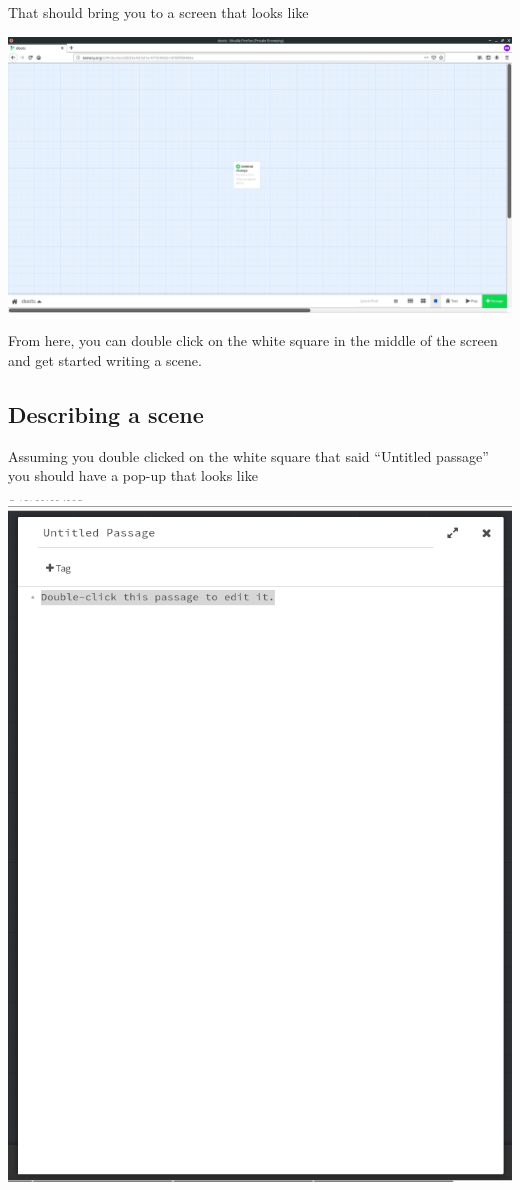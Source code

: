 \documentclass[a5paper,11pt]{article}
\begin{document}
That should bring you to a screen that looks like

\includegraphics[width=1.1\linewidth]{TwineHome}

From here, you can double click on the white square in the middle of the screen and get started writing a scene. 
\subsection{Describing a scene}
Assuming you double clicked on the white square that said ``Untitled passage'' you should have a pop-up that looks like

\includegraphics[width=0.9\linewidth]{EditPassage}
\end{document}

